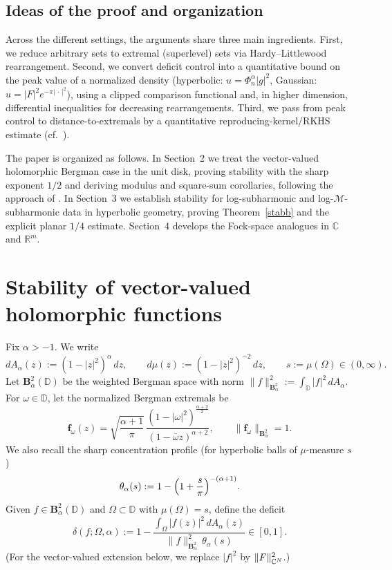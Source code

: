 \documentclass[a4paper,10pt]{amsart}
\newcommand{\D}{\mathbb{D}}
\newcommand{\Berg}{\mathbf{B}_{\alpha}^2}
\begin{document}
\subsection{Ideas of the proof and organization}

Across the different settings, the arguments share three main ingredients.
First, we reduce arbitrary sets to extremal (superlevel) sets via Hardy--Littlewood rearrangement.
Second, we convert deficit control into a quantitative bound on the peak value of a normalized
density (hyperbolic: $u=\Phi_n^\alpha|g|^2$, Gaussian: $u=|F|^2e^{-\pi|\,\cdot\,|^2}$), using a
clipped comparison functional and, in higher dimension, differential inequalities for decreasing
rearrangements. Third, we pass from peak control to distance-to-extremals by a quantitative
reproducing-kernel/RKHS estimate (cf.\ \cite{kulikov2022}).

The paper is organized as follows. In Section~2 we treat the vector-valued holomorphic Bergman case
in the unit disk, proving stability with the sharp exponent $1/2$ and deriving modulus and
square-sum corollaries, following the approach of \cite{GomezKalajMelentijevicRamos2025}.
In Section~3 we establish stability for log-subharmonic and log-$\mathcal M$-subharmonic data in
hyperbolic geometry, proving Theorem~\ref{stabb} and the explicit planar $1/4$ estimate.
Section~4 develops the Fock-space analogues in $\mathbb C$ and $\mathbb R^m$.

\section{Stability of vector-valued holomorphic functions}

Fix $\alpha>-1$. We write
\[
dA_\alpha(z):=(1-|z|^2)^\alpha\,dz,
\qquad
d\mu(z):=(1-|z|^2)^{-2}\,dz,
\qquad
s:=\mu(\Omega)\in(0,\infty).
\]
Let $\mathbf B_\alpha^2(\D)$ be the weighted Bergman space with norm
$\|f\|_{\Berg}^2:=\int_\D |f|^2\,dA_\alpha$.
For $\omega\in\D$, let the normalized Bergman extremals be
\[
\mathbf f_{\omega}(z)
=
\sqrt{\frac{\alpha+1}{\pi}}\,
\frac{(1-|\omega|^2)^{\frac{\alpha+2}{2}}}{(1-\overline{\omega}z)^{\alpha+2}},
\qquad \|\mathbf f_\omega\|_{\Berg}=1.
\]
We also recall the sharp concentration profile (for hyperbolic balls of $\mu$-measure $s$)
\[
\theta_\alpha(s):=1-\Bigl(1+\frac{s}{\pi}\Bigr)^{-(\alpha+1)}.
\]
Given $f\in\mathbf B_\alpha^2(\D)$ and $\Omega\subset\D$ with $\mu(\Omega)=s$, define the deficit
\begin{equation}\label{eq:deficit-scalar}
\delta(f;\Omega,\alpha)
:=
1-\frac{\int_\Omega |f(z)|^2\,dA_\alpha(z)}{\|f\|_{\Berg}^2\,\theta_\alpha(s)}
\in[0,1].
\end{equation}
(For the vector-valued extension below, we replace $|f|^2$ by $\|F\|_{\mathbb{C}^N}^2$.)
\end{document}
